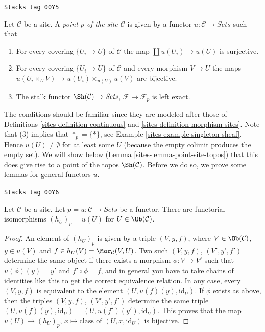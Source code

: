 \begin{definition}[Point]
\label{sites-definition-point}
\href{https://stacks.math.columbia.edu/tag/00Y5}{\texttt{Stacks tag 00Y5}}

Let $\mathcal{C}$ be a site. A {\it point $p$ of the site
$\mathcal{C}$} is given by a functor $u : \mathcal{C}
\to \textit{Sets}$ such that
\begin{enumerate}
\item For every covering $\{U_i \to U\}$ of $\mathcal{C}$ the map
$\coprod u(U_i) \to u(U)$ is surjective.
\item For every covering $\{U_i \to U\}$ of $\mathcal{C}$ and
every morphism $V \to U$ the maps
$u(U_i \times_U V) \to u(U_i) \times_{u(U)} u(V)$ are bijective.
\item The stalk functor $\Sh(\mathcal{C}) \to \textit{Sets}$,
$\mathcal{F} \mapsto \mathcal{F}_p$ is left exact.
\end{enumerate}
\end{definition}

The conditions should be familiar since they are modeled after those of
Definitions \ref{sites-definition-continuous} and
\ref{sites-definition-morphism-sites}.
Note that (3) implies that $*_p = \{*\}$, see
Example \ref{sites-example-singleton-sheaf}. Hence $u(U) \not = \emptyset$
for at least some $U$ (because the empty colimit produces the
empty set). We will show below (Lemma \ref{sites-lemma-point-site-topos})
that this does give rise
to a point of the topos $\Sh(\mathcal{C})$.
Before we do so, we prove some lemmas for general functors $u$.

\begin{lemma}
\label{sites-lemma-points-recover}
\href{https://stacks.math.columbia.edu/tag/00Y6}{\texttt{Stacks tag 00Y6}}

Let $\mathcal{C}$ be a site.
Let $p = u : \mathcal{C} \to \textit{Sets}$ be a functor.
There are functorial isomorphisms
$(h_U)_p = u(U)$ for $U \in \Ob(\mathcal{C})$.
\end{lemma}

\begin{proof}
An element of $(h_U)_p$ is given by a triple $(V, y, f)$,
where $V \in \Ob(\mathcal{C})$, $y\in u(V)$ and
$f \in h_U(V) = \Mor_\mathcal{C}(V, U)$.
Two such $(V, y, f)$, $(V', y', f')$ determine the same object if
there exists a morphism $\phi : V \to V'$ such that
$u(\phi)(y) = y'$ and $f' \circ \phi = f$, and in general you have
to take chains of identities like this to get the correct equivalence
relation. In any case, every $(V, y, f)$ is equivalent to
the element $(U, u(f)(y), \text{id}_U)$. If $\phi$ exists as above,
then the triples $(V, y, f)$, $(V', y', f')$ determine the same triple
$(U, u(f)(y), \text{id}_U) = (U, u(f')(y'), \text{id}_U)$.
This proves that the map
$u(U) \to (h_U)_p$, $x \mapsto \text{class of }(U, x, \text{id}_U)$
is bijective.
\end{proof}

